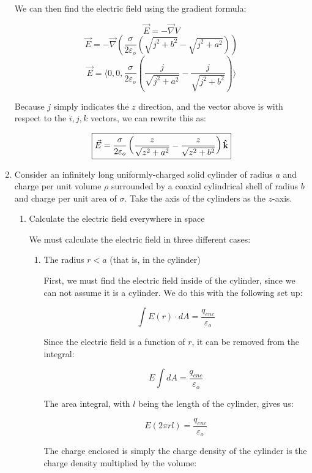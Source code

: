 \begin{enumerate}
    We can then find the electric field using the gradient formula:

    $$\vec{E}=-\vec{\nabla}V$$
    $$\vec{E}=-\vec{\nabla}\left(  \frac{\sigma}{2\varepsilon_o}\left(  \sqrt{j^2+b^2}-\sqrt{j^2+a^2}\right) \right)$$
    $$\boxed{\vec{E}=\langle 0, 0, \frac{\sigma}{2\varepsilon_o}\left( \frac{j}{\sqrt{j^2+a^2}}-\frac{j}{\sqrt{j^2+b^2}} \right)\rangle}$$

    Because $j$ simply indicates the $z$ direction, and the vector above is with respect to the $i,j,k$ vectors, we can rewrite this as:

    $$\boxed{\vec{E}=\frac{\sigma}{2\varepsilon_o}\left( \frac{z}{\sqrt{z^2+a^2}}-\frac{z}{\sqrt{z^2+b^2}} \right)\bold{\hat{k}}}$$
    
  \item Consider an infinitely long uniformly-charged solid cylinder of radius $a$ and charge per unit volume $\rho$ surrounded by a coaxial cylindrical shell of radius $b$ and charge per unit area of $\sigma$. Take the axis of the cylinders as the $z$-axis.

    \begin{enumerate}

      \item Calculate the electric field everywhere in space

        We must calculate the electric field in three different cases:

        \begin{enumerate}

          \item The radius $r<a$ (that is, in the cylinder)

            First, we must find the electric field inside of the cylinder, since we can not assume it is a cylinder. We do this with the following set up:

            $$\int E(r)\cdot dA=\frac{q_{enc}}{\varepsilon_o}$$

            Since the electric field is a function of $r$, it can be removed from the integral:

            $$E\int dA=\frac{q_{enc}}{\varepsilon_o}$$

            The area integral, with $l$ being the length of the cylinder, gives us:

            $$E(2\pi rl)=\frac{q_{enc}}{\varepsilon_o}$$

            The charge enclosed is simply the charge density of the cylinder is the charge density multiplied by the volume:


\end{enumerate}
\end{enumerate}
\end{enumerate}
